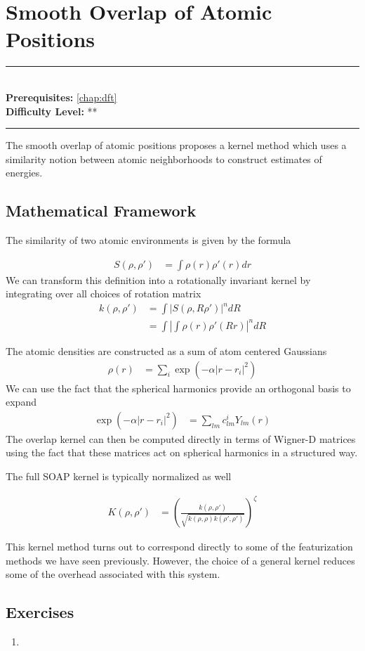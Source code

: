 \documentclass[book.tex]{subfiles}
\begin{document}
\chapter{Smooth Overlap of Atomic Positions}

\label{chap:soap}
\noindent\rule{11cm}{0.4pt} \\
\textbf{Prerequisites:} \autoref{chap:dft} \\
\textbf{Difficulty Level:} ** \\
\noindent\rule{11cm}{0.4pt}
\vspace{5mm}

The smooth overlap of atomic positions proposes a kernel method which uses a similarity notion between atomic neighborhoods to construct estimates of energies.

\section{Mathematical Framework}

The similarity of two atomic environments is given by the formula

\begin{align}
S(\rho, \rho') &= \int \rho(r) \rho'(r) dr
\end{align}
We can transform this definition into a rotationally invariant kernel by integrating over all choices of rotation matrix
\begin{align}
k(\rho, \rho') &= \int \left | S(\rho, R \rho') \right |^n  dR \\
&= \int \left | \int \rho(r) \rho'(R r)\right |^n  dR
\end{align}

The atomic densities are constructed as a sum of atom centered Gaussians
\begin{align}
\rho(r) &= \sum_i \exp(-\alpha |r - r_i|^2)
\end{align}
We can use the fact that the spherical harmonics provide an orthogonal basis to expand
\begin{align}
\exp(-\alpha|r - r_i|^2) &= \sum_{lm} c^i_{lm} Y_{lm}(r)
\end{align}
The overlap kernel can then be computed directly in terms of Wigner-D matrices using the fact that these matrices act on spherical harmonics in a structured way.

The full SOAP kernel is typically normalized as well

\begin{align}
K(\rho, \rho') &= \left (\frac{k(\rho,\rho')}{\sqrt{k(\rho, \rho)k(\rho', \rho')}} \right )^\zeta
\end{align}

This kernel method turns out to correspond directly to some of the featurization methods we have seen previously. However, the choice of a general kernel reduces some of the overhead associated with this system.

\section{Exercises}

\begin{enumerate}
    \item 
\end{enumerate}
\end{document}
